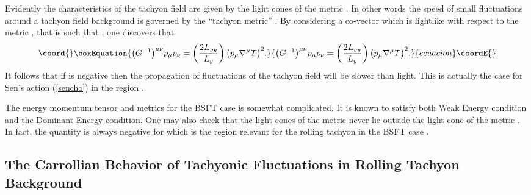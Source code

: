 \documentclass[a4paper,12pt]{article}
\begin{document}
Evidently the characteristics of the tachyon field are given by
the light cones of the metric \coordHE{}. In other words the
speed of small fluctuations around a tachyon field background is
governed by the ``tachyon metric'' \coordHE{}.   By considering
a co-vector \coordHE{} which is lightlike with respect to the metric
\coordHE{}, that is such that \coordHE{}, one
discovers that
\begin{equation}\coord{}\boxEquation{ \bigl ( G^{-1}\bigr ) ^{\mu
\nu} p_\mu p_\nu=  \left(\frac{2L_{yy}}{L_y}\right)  \bigl(p_\mu
\nabla ^\mu T \bigr ) ^2 . 
}{ \bigl ( G^{-1}\bigr ) ^{\mu
\nu} p_\mu p_\nu=  \left(\frac{2L_{yy}}{L_y}\right)  \bigl(p_\mu
\nabla ^\mu T \bigr ) ^2 . 
}{ecuacion}\coordE{}\end{equation} 
It follows that if \coordHE{} 
is negative then the propagation of fluctuations of the
tachyon field will be slower than light. This is actually the case
for Sen's action (\ref{sencho}) in the region \coordHE{}.

The energy momentum tensor and metrics for the BSFT case is
somewhat complicated. It is known to satisfy both Weak Energy
condition and the Dominant  Energy condition. One may also check
that the light cones of the metric  \coordHE{} never lie
outside the light cone of the metric \coordHE{}. 
In fact, the quantity \coordHE{} is always negative for 
\coordHE{} which is the region relevant for the rolling tachyon
in the BSFT case \cite{Terashima}. 


\subsection{The Carrollian Behavior of Tachyonic
Fluctuations in Rolling Tachyon Background}
\end{document}
